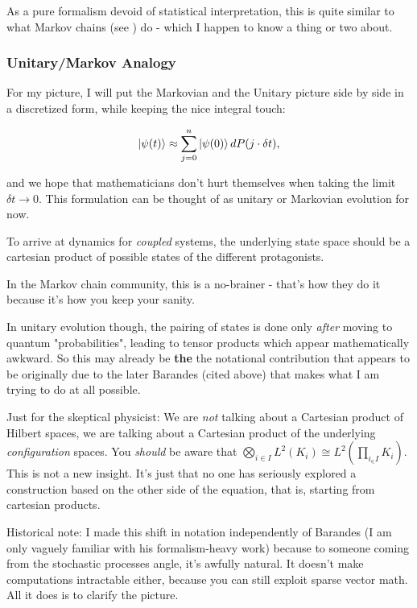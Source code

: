 \documentclass{article}
\begin{document}
As a pure formalism devoid of statistical interpretation, this is quite similar to what Markov chains (see \cite{LevinPeres2017}) do - which I happen to know a thing or two about.

\subsubsection{Unitary/Markov Analogy}

For my picture, I will put the Markovian and the Unitary picture side by side in a discretized form, while keeping the nice integral touch:

\begin{align*}
\ket{\psi(t)} \approx \sum_{j=0}^n \ket{\psi(0)} d P(j\cdot\delta t),
\end{align*}

and we hope that mathematicians don't hurt themselves when taking the limit $\delta t \to 0$. This formulation can be thought of as unitary or Markovian evolution for now.

To arrive at dynamics for \textit{coupled} systems, the underlying state space should be a cartesian product of possible states of the different protagonists.

In the Markov chain community, this is a no-brainer - that's how they do it because it's how you keep your sanity.

In unitary evolution though, the pairing of states is done only \textit{after} moving to quantum "probabilities", leading to tensor products which appear mathematically awkward. So this may already be \textbf{the} the notational contribution that appears to be originally due to the later Barandes (cited above) that makes what I am trying to do at all possible.

Just for the skeptical physicist: We are \textit{not} talking about a Cartesian product of Hilbert spaces, we are talking about a Cartesian product of the underlying \textit{configuration} spaces. You \textit{should} be aware that $\bigotimes_{i \in I} L^2(K_i) \cong L^2(\prod_{i_\in I}K_i)$. This is not a new insight. It's just that no one has seriously explored a construction based on the other side of the equation, that is, starting from cartesian products.

Historical note: I made this shift in notation independently of Barandes (I am only vaguely familiar with his formalism-heavy work) because to someone coming from the stochastic processes angle, it's awfully natural. It doesn't make computations intractable either, because you can still exploit sparse vector math. All it does is to clarify the picture.
\end{document}
